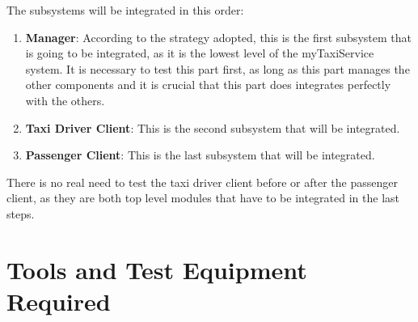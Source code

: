 \documentclass[18pt,oneside,a4paper, titlepage]{article}
\begin{document}
			The subsystems will be integrated in this order:
			\begin{enumerate}
				\item \textbf{Manager}: According to the strategy adopted, this is the first subsystem that is going to be integrated, as it is the lowest level of the myTaxiService system. It is necessary to test this part first, as long as this part manages the other components and it is crucial that this part does integrates perfectly with the others.
				\item \textbf{Taxi Driver Client}: This is the second subsystem that will be integrated.
				\item \textbf{Passenger Client}: This is the last subsystem that will be integrated.
			\end{enumerate}
			There is no real need to test the taxi driver client before or after the passenger client, as they are both top level modules that have to be integrated in the last steps. 
		

\newpage



\newpage
\section{Tools	and	Test	Equipment	Required}
\end{document}
